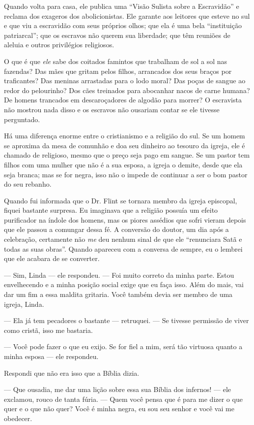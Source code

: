 Quando volta para casa, ele publica uma ``Visão Sulista sobre a
Escravidão'' e reclama dos exageros dos abolicionistas. Ele garante aos
leitores que esteve no sul e que viu a escravidão com seus próprios
olhos; que ela é uma bela ``instituição patriarcal''; que os escravos
não querem sua liberdade; que têm reuniões de aleluia e outros
privilégios religiosos.

O que é que \emph{ele} sabe dos
coitados famintos que trabalham de sol a sol nas fazendas? Das mães que
gritam pelos filhos, arrancados dos seus braços por traficantes? Das
meninas arrastadas para o lodo moral? Das poças de sangue ao redor do
pelourinho? Dos cães treinados para abocanhar nacos de carne humana? De
homens trancados em descaroçadores de algodão para morrer? O escravista
não mostrou nada disso e os escravos não ousariam contar se ele tivesse
perguntado.

Há
uma diferença enorme entre o cristianismo e a religião do sul. Se um
homem se aproxima da mesa de comunhão e doa seu dinheiro ao tesouro da
igreja, ele é chamado de religioso, mesmo que o preço seja pago em
sangue. Se um pastor tem filhos com uma mulher que não é a sua esposa, a
igreja o demite, desde que ela seja branca; mas se for negra, isso não o
impede de continuar a ser o bom pastor do seu rebanho.

Quando fui informada que o Dr. Flint se
tornara membro da igreja episcopal, fiquei bastante surpresa. Eu
imaginava que a religião possuía um efeito purificador na índole dos
homens, mas os piores assédios que sofri vieram depois que ele passou a
comungar dessa fé. A conversão do doutor, um dia após a celebração,
certamente não \emph{me} deu nenhum sinal de que ele ``renunciara Satã e
todas as suas obras''. Quando apareceu com a conversa de sempre, eu o
lembrei que ele acabara de se converter.

--- Sim, Linda --- ele respondeu. --- Foi muito correto da minha parte.
Estou envelhecendo e a minha posição social exige que eu faça isso. Além
do mais, vai dar um fim a essa maldita gritaria. Você também devia ser
membro de uma igreja, Linda.

--- Ela já tem pecadores o bastante ---
retruquei. --- Se tivesse permissão de viver como cristã, isso me
bastaria.

--- Você pode fazer o que eu exijo. Se
for fiel a mim, será tão virtuosa quanto a minha esposa --- ele
respondeu.

Respondi que não era isso que a Bíblia
dizia.

--- Que ousadia, me dar uma lição sobre
essa sua Bíblia dos infernos! --- ele exclamou, rouco de tanta fúria.
--- Quem você pensa que é para me dizer o que quer e o que não quer?
Você é minha negra, eu sou seu senhor e você vai me obedecer.

